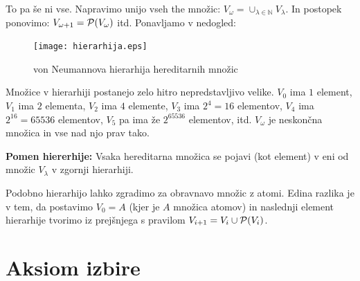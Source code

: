 \documentclass[11pt,paper=b5,footinclude,headinclude]{scrbook} %
\def\sledi {{~\Rightarrow~}}
\begin{document}
To pa še ni vse.
Napravimo unijo vseh the množic:
$V_\omega = \cup_{\lambda \in \mathbb{N}}V_\lambda$.
In postopek ponovimo:
$V_{\omega+1} = {\cal P}(V_\omega)$ itd.
Ponavljamo v nedogled:

\begin{figure}[h!]
\begin{center}
\texttt{[image: hierarhija.eps]}
\caption{von Neumannova hierarhija hereditarnih množic}
\end{center}
\end{figure}

Množice v hierarhiji postanejo zelo hitro nepredstavljivo velike.
$V_0$ ima $1$ element, $V_1$ ima $2$ elementa, $V_2$ ima $4$ elemente, $V_3$ ima $2^4 = 16$ elementov,
$V_4$ ima $2^{16} = 65536$ elementov, $V_5$ pa ima že $2^{65536}$ elementov, itd.
$V_\omega$ je neskončna množica in vse nad njo prav tako.

\textbf{ Pomen hiererhije:}
Vsaka hereditarna  množica se pojavi (kot element) v eni od množic $V_\lambda$ v zgornji hierarhiji.

Podobno hierarhijo lahko zgradimo za obravnavo množic z atomi. Edina razlika je v tem, da
postavimo $V_0 = A$ (kjer je $A$ množica atomov)
in naslednji element hierarhije tvorimo iz prejšnjega s pravilom $V_{i+1} = V_i\cup {\cal P}(V_i)$.

\newpage

\chapter{Aksiom izbire}


%
%
%
%
%
\end{document}
